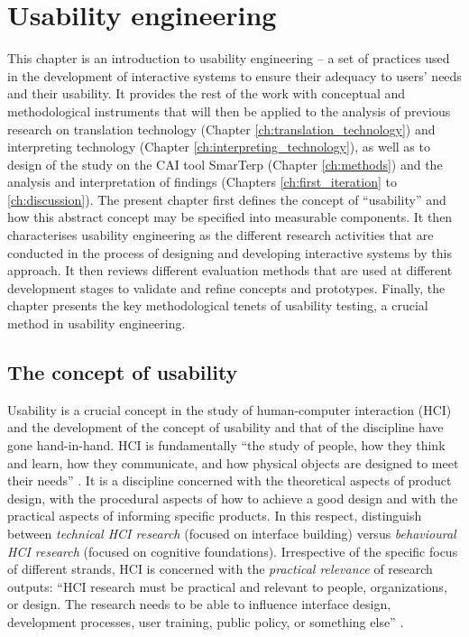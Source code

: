\chapter{Usability engineering}\label{ch:usability_engineering}

This chapter is an introduction to usability engineering -- a set of practices used in the development of interactive systems to ensure their adequacy to users’ needs and their usability. It provides the rest of the work with conceptual and methodological instruments that will then be applied to the analysis of previous research on translation technology (Chapter \ref{ch:translation_technology}) and interpreting technology (Chapter \ref{ch:interpreting_technology}), as well as to design of the study on the CAI tool SmarTerp (Chapter \ref{ch:methods}) and the analysis and interpretation of findings (Chapters \ref{ch:first_iteration} to \ref{ch:discussion}). The present chapter first defines the concept of “usability” and how this abstract concept may be specified into measurable components. It then characterises usability engineering as the different research activities that are conducted in the process of designing and developing interactive systems by this approach. It then reviews different evaluation methods that are used at different development stages to validate and refine concepts and prototypes. Finally, the chapter presents the key methodological tenets of usability testing, a crucial method in usability engineering.


\section{The concept of usability}


Usability is a crucial concept in the study of human-computer interaction (HCI) and the development of the concept of usability and that of the discipline have gone hand-in-hand. HCI is fundamentally ``the study of people, how they think and learn, how they communicate, and how physical objects are designed to meet their needs'' \citep[7]{lazar2017research}. It is a discipline concerned with the theoretical aspects of product design, with the procedural aspects of how to achieve a good design and with the practical aspects of informing specific products. In this respect, \citet[10]{lazar2017research} distinguish between \textit{technical HCI research} (focused on interface building) versus \textit{behavioural HCI research} (focused on cognitive foundations). Irrespective of the specific focus of different strands, HCI is concerned with the \textit{practical relevance} of research outputs: ``HCI research must be practical and relevant to people, organizations, or design. The research needs to be able to influence interface design, development processes, user training, public policy, or something else'' \citep[7]{lazar2017research}.

